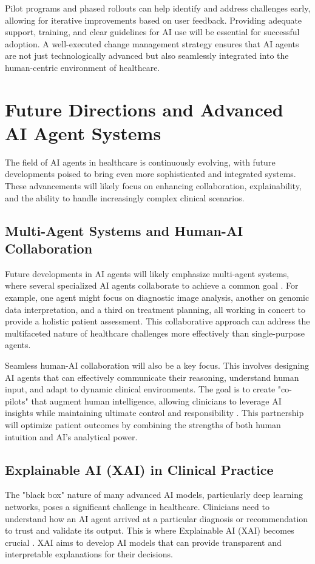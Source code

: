 \documentclass[12pt,a4paper]{article}
\begin{document}
Pilot programs and phased rollouts can help identify and address challenges early, allowing for iterative improvements based on user feedback. Providing adequate support, training, and clear guidelines for AI use will be essential for successful adoption. A well-executed change management strategy ensures that AI agents are not just technologically advanced but also seamlessly integrated into the human-centric environment of healthcare.

\section{Future Directions and Advanced AI Agent Systems}
\label{sec:future_directions}
The field of AI agents in healthcare is continuously evolving, with future developments poised to bring even more sophisticated and integrated systems. These advancements will likely focus on enhancing collaboration, explainability, and the ability to handle increasingly complex clinical scenarios.

\subsection{Multi-Agent Systems and Human-AI Collaboration}
\label{sec:multi_agent_systems}
Future developments in AI agents will likely emphasize multi-agent systems, where several specialized AI agents collaborate to achieve a common goal \cite{russell2010artificial}. For example, one agent might focus on diagnostic image analysis, another on genomic data interpretation, and a third on treatment planning, all working in concert to provide a holistic patient assessment. This collaborative approach can address the multifaceted nature of healthcare challenges more effectively than single-purpose agents.

Seamless human-AI collaboration will also be a key focus. This involves designing AI agents that can effectively communicate their reasoning, understand human input, and adapt to dynamic clinical environments. The goal is to create "co-pilots" that augment human intelligence, allowing clinicians to leverage AI insights while maintaining ultimate control and responsibility \cite{nih_ethical_implications}. This partnership will optimize patient outcomes by combining the strengths of both human intuition and AI's analytical power.

\subsection{Explainable AI (XAI) in Clinical Practice}
\label{sec:explainable_ai}
The "black box" nature of many advanced AI models, particularly deep learning networks, poses a significant challenge in healthcare. Clinicians need to understand how an AI agent arrived at a particular diagnosis or recommendation to trust and validate its output. This is where Explainable AI (XAI) becomes crucial \cite{goodfellow2016deep}. XAI aims to develop AI models that can provide transparent and interpretable explanations for their decisions.
\end{document}
